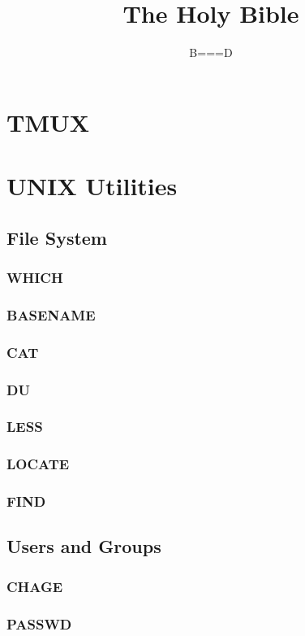 \documentclass[12pt,a4paper]{article}
\title{The Holy Bible}
\date{}
\author{B===D}
\begin{document}
\maketitle

\section{TMUX}

\section{UNIX Utilities}
\subsection{File System}
\subsubsection{WHICH}
\subsubsection{BASENAME}
\subsubsection{CAT}
\subsubsection{DU}
\subsubsection{LESS}
\subsubsection{LOCATE}
\subsubsection{FIND}
\subsection{Users and Groups}
\subsubsection{CHAGE}
\subsubsection{PASSWD}
\end{document}
